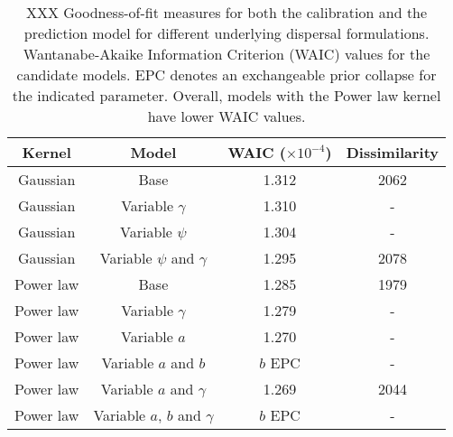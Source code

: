 \begin{table}
\begin{center}
\begin{tabular}{cccc} 
\toprule
Kernel    & Model                          & WAIC ($\times 10^{-4}$) & Dissimilarity \\ \midrule
Gaussian  & Base                           & 1.312   & 2062 \\
Gaussian  & Variable $\gamma$              & 1.310   &  -   \\
Gaussian  & Variable $\psi$                & 1.304   &  -   \\   
Gaussian  & Variable $\psi$ and $\gamma$   & 1.295   & 2078 \\
Power law & Base                           & 1.285   & 1979 \\
Power law & Variable $\gamma$              & 1.279   &  -   \\
Power law & Variable $a$                   & 1.270   &  -   \\
Power law & Variable $a$ and $b$           & $b$ EPC &  -   \\
Power law & Variable $a$ and $\gamma$      & 1.269   & 2044 \\  
Power law & Variable $a$, $b$ and $\gamma$ & $b$ EPC &  -   \\
\bottomrule
\end{tabular}
\caption{XXX Goodness-of-fit measures for both the calibration and the
  prediction model for different underlying dispersal
  formulations. Wantanabe-Akaike Information Criterion (WAIC) values
  for the candidate models. EPC denotes an exchangeable prior collapse
  for the indicated parameter. Overall, models with the Power law
  kernel have lower WAIC values.}
\end{center}
\label{table:GOF}
\vspace{2cm}
\end{table}

